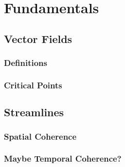\chapter{Fundamentals}
\section{Vector Fields}
\subsection{Definitions}
\subsection{Critical Points}
\section{Streamlines}
\subsection{Spatial Coherence}
\subsection{Maybe Temporal Coherence?}